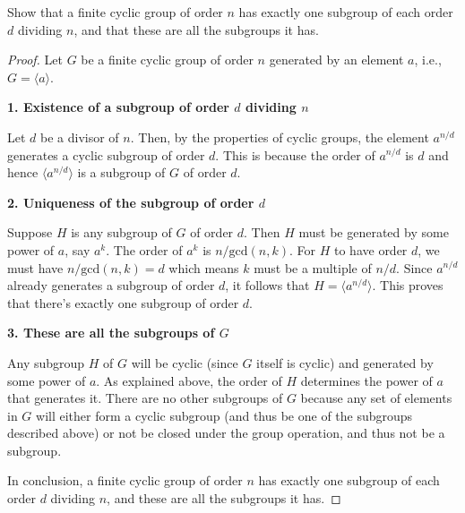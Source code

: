 \documentclass[12pt]{amsart}
\theoremstyle{definition}
\numberwithin{equation}{section}
\theoremstyle{plain}
\begin{document}
\vspace*{50pt}
\begin{exercise}{45} Show that a finite cyclic group of order $n$ has exactly one subgroup of each order $d$ dividing $n$, and that these are all the subgroups it has.
\begin{proof}
    
    Let \( G \) be a finite cyclic group of order \( n \) generated by an element \( a \), i.e., \( G = \langle a \rangle \).
    
    \textbf{1. Existence of a subgroup of order \( d \) dividing \( n \)}
    
    Let \( d \) be a divisor of \( n \). Then, by the properties of cyclic groups, the element \( a^{n/d} \) generates a cyclic subgroup of order \( d \). This is because the order of \( a^{n/d} \) is \( d \) and hence \( \langle a^{n/d} \rangle \) is a subgroup of \( G \) of order \( d \).
    
    \textbf{2. Uniqueness of the subgroup of order \( d \)}
    
    Suppose \( H \) is any subgroup of \( G \) of order \( d \). Then \( H \) must be generated by some power of \( a \), say \( a^k \). The order of \( a^k \) is \( n/\text{gcd}(n,k) \). For \( H \) to have order \( d \), we must have \( n/\text{gcd}(n,k) = d \) which means \( k \) must be a multiple of \( n/d \). Since \( a^{n/d} \) already generates a subgroup of order \( d \), it follows that \( H = \langle a^{n/d} \rangle \). This proves that there's exactly one subgroup of order \( d \).
    
    \textbf{3. These are all the subgroups of \( G \)}
    
    Any subgroup \( H \) of \( G \) will be cyclic (since \( G \) itself is cyclic) and generated by some power of \( a \). As explained above, the order of \( H \) determines the power of \( a \) that generates it. There are no other subgroups of \( G \) because any set of elements in \( G \) will either form a cyclic subgroup (and thus be one of the subgroups described above) or not be closed under the group operation, and thus not be a subgroup.
    
    In conclusion, a finite cyclic group of order \( n \) has exactly one subgroup of each order \( d \) dividing \( n \), and these are all the subgroups it has.
\end{proof}
\end{exercise}
\end{document}
